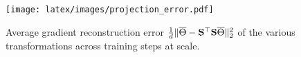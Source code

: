
\begin{figure}[t]

        \centering
        \texttt{[image: latex/images/projection\_error.pdf]}
        \vspace{-5mm}
    \caption{Average gradient reconstruction error $\frac{1}{d}\Vert \overline{\Theta} - {\mathbf{S}}^\top {\mathbf{S}} \overline{\Theta}\Vert_2^2$ of the various transformations across training steps at \tinyB scale.}
    \label{fig:reconstruction_figure}
    \vcram{-3mm}
\end{figure}
